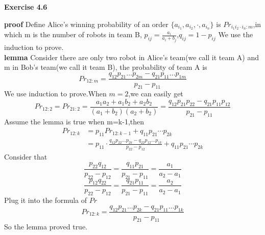 \documentclass{article} %
\begin{document}
   \textbf{Exercise 4.6}\par
	\textbf{proof} Define Alice's winning probability of an order $\{a_{i_1},a_{i_2},\cdot,a_{i_n}\}$ is $Pr_{i_1i_2 \cdot i_n:m}$,in which m is the number of robots in team B, $p_{ij}=\frac{a_i}{a_i+b_j}$,$q_{ij}=1-p_{ij}$  We use the induction to prove.\\

    \textbf{lemma} Consider there are only two robot in Alice's team(we call it team A) and m in Bob's team(we call it team B), the probability of team A is
    \begin{equation}
     Pr_{12:m}=\frac{q_{12}p_{21}\dots p_{2m}-q_{21}p_{11}\dots p_{1m}}{p_{21}-p_{11}}
    \end{equation}
    We use induction to prove.When $m=2$,we can easily get
    \begin{equation}
    Pr_{12:2}=Pr_{21:2}=\frac{a_1a_2+a_1b_2+a_2b_2}{(a_1+b_2)(a_2+b_2)}=\frac{q_{12}p_{21}p_{22}-q_{21}p_{11}p_{12}}{p_{21}-p_{11}}
    \end{equation}
    Assume the lemma is true when m=k-1,then
    \begin{equation}
    \begin{aligned}
    Pr_{12:k}&=p_{11}Pr_{12:k-1}+q_{11}p_{21}\cdots p_{2k}\\
    		 &=p_{11}\cdot \frac{q_{12}p_{22}\dots p_{2k}-q
    		 	_{22}p_{12}\dots p_{1k}}{p_{22}-p_{12}}+q_{11}p_{21}\cdots p_{2k}
    \end{aligned}
    \end{equation}
    Consider that
    $$
    \frac{p_{22}q_{12}}{p_{22}-p_{12}}=\frac{q_{11}p_{21}}{p_{21}-p_{11}}=\frac{a_1}{a_2-a_1}
    $$
    $$
    \frac{p_{12}q_{22}}{p_{22}-p_{12}}=\frac{q_{21}p_{11}}{p_{21}-p_{11}}=\frac{a_2}{a_2-a_1}
    $$
    Plug it into the formula of $Pr$
    $$
    Pr_{12:k}=\frac{q_{12}p_{21}\dots p_{2k}-q_{21}p_{11}\dots p_{1k}}{p_{21}-p_{11}}
    $$
    So the lemma proved true.\\
\end{document}
